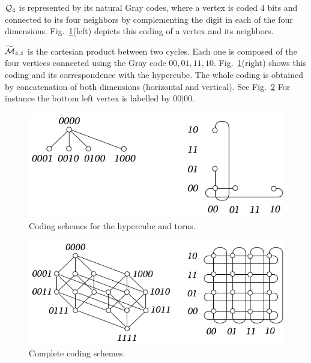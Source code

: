 \begin{itemize}
$\mbox{$\cal Q$}_4$ is represented by its natural Gray codes,
where a vertex is coded 4 bits and connected to its four neighbors by complementing 
the digit in each of the four dimensions.
Fig.~\ref{fig:IsomorphismCodingPrinciple}(left) depicts this coding of a vertex and its neighbors.
\medskip

$\widetilde{\mbox{$\cal M$}}_{4,4}$ is the cartesian product between two cycles.
Each one is composed of the four vertices connected using the Gray code
$00, 01, 11, 10$.
Fig.~\ref{fig:IsomorphismCodingPrinciple}(right) shows this coding and 
its correspondence with the hypercube. 
The whole coding is obtained by concatenation of both dimensions (horizontal and vertical).
See Fig.~\ref{fig:IsomorphismCodingComplete}
For instance the bottom left vertex is labelled by $00 | 00$. 
\medskip
 \begin{figure}[hbt]
\begin{center}
       \includegraphics[scale=0.45]{FiguresGraph/IsomorphismEx2}
       \caption{Coding schemes for the hypercube and torus.}
  \label{fig:IsomorphismCodingPrinciple}
\end{center}
\end{figure}
 \begin{figure}[hbt]
\begin{center}
       \includegraphics[scale=0.45]{FiguresGraph/IsomorphismEx1}
       \caption{Complete coding schemes.}
  \label{fig:IsomorphismCodingComplete}
\end{center}
\end{figure}


\end{itemize}

